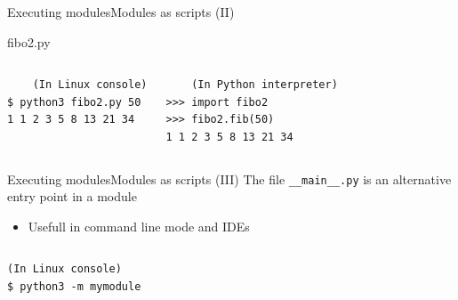 \documentclass[10pt,compress]{beamer} %
\begin{document}
\begin{frame}{Executing modules}{Modules as scripts (II)}
    \small
	\vspace{-0.3cm}
	\begin{exampleblock}{fibo2.py}
	\vspace{-0.2cm}
	
	\vspace{-0.2cm}
	\end{exampleblock}

	\vspace{-0.5cm}
	\begin{columns}
	\begin{exampleblock}{}
	\vspace{-0.2cm}
	\begin{verbatim}
    (In Linux console)
$ python3 fibo2.py 50
1 1 2 3 5 8 13 21 34
\end{verbatim}
	\vspace{-0.2cm}
	\end{exampleblock}

	\begin{exampleblock}{}
	\vspace{-0.2cm}
	\begin{verbatim}
    (In Python interpreter)
>>> import fibo2
>>> fibo2.fib(50)
1 1 2 3 5 8 13 21 34
\end{verbatim}
	\vspace{-0.2cm}
	\end{exampleblock}

    \end{columns}
\end{frame}

\begin{frame}[fragile]{Executing modules}{Modules as scripts (III)}
	The file \texttt{\_\_main\_\_.py} is an alternative entry point in a module
		\begin{itemize}
			\item Usefull in command line mode and IDEs
		\end{itemize}

	\begin{columns}
	\begin{exampleblock}{}
	\vspace{-0.2cm}
	\begin{verbatim}
(In Linux console)
$ python3 -m mymodule
\end{verbatim}
	\vspace{-0.2cm}
	\end{exampleblock}
	\end{columns}

\end{frame}
\end{document}
